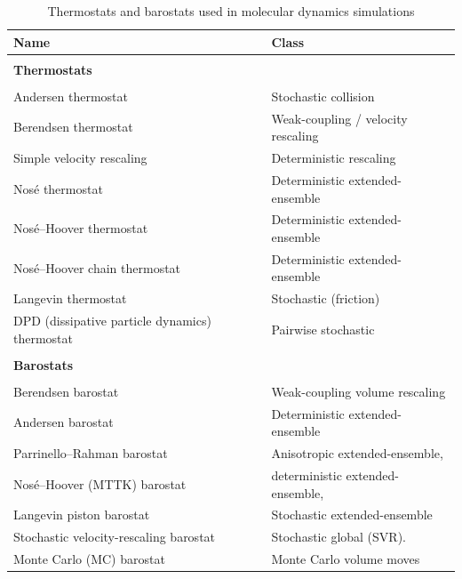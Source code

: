 \documentclass[12pt]{article}
\begin{document}
\begin{table}
\centering
\caption{ Thermostats and barostats used in molecular dynamics simulations}
\label{tab:thermostats_barostats}
\begin{tabular}{ll}
\hline
\textbf{Name} & \textbf{Class} \\
\hline
\\
\textbf{Thermostats} \\
\\
Andersen thermostat\cite{CH9_andersen1980molecular}  & Stochastic collision \\
Berendsen thermostat\cite{CH9_berendsen1984molecular} & Weak-coupling / velocity rescaling \\
Simple velocity rescaling\cite{CH9_bussi2007canonical} & Deterministic rescaling \\
Nos\'e thermostat\cite{CH9_nose1984unified} & Deterministic extended-ensemble \\
Nos\'e--Hoover thermostat\cite{CH9_hoover1985canonical} & Deterministic extended-ensemble \\
Nos\'e--Hoover chain thermostat\cite{CH9_Martyna1992} & Deterministic extended-ensemble \\
Langevin thermostat\cite{CH9_langevin1908theorie} & Stochastic (friction) \\
DPD (dissipative particle dynamics) thermostat\cite{CH9_soddemann2003dissipative} & Pairwise stochastic \\
\hline
\hline
\\
\textbf{Barostats}\\
\\
Berendsen barostat\cite{CH9_berendsen1984molecular} & Weak-coupling volume rescaling \\
Andersen barostat\cite{CH9_andersen1980molecular} & Deterministic extended-ensemble \\
Parrinello--Rahman barostat\cite{CH9_parrinello1980crystal} & Anisotropic extended-ensemble,  \\
Nos\'e--Hoover (MTTK) barostat\cite{CH9_tuckerman2001non} & deterministic extended-ensemble,  \\
Langevin piston barostat\cite{CH9_quigley2004langevin} & Stochastic extended-ensemble \\
Stochastic velocity-rescaling barostat\cite{CH9_bussi2009isothermal} & Stochastic global (SVR). \\
Monte Carlo (MC) barostat\cite{CH9_janek2024novel} & Monte Carlo volume moves \\
\hline
\end{tabular}
\end{table}
\end{document}
